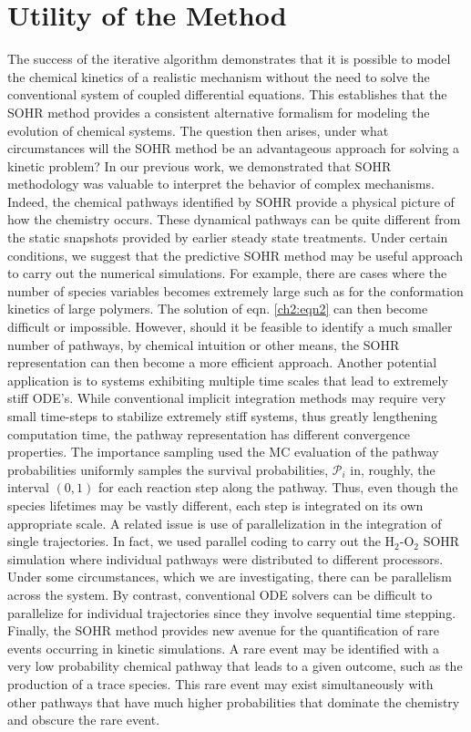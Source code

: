 \section{Utility of the Method}
\label{ch4:sec:utility}
The success of the iterative
algorithm demonstrates that it is possible to model the
chemical kinetics of a realistic mechanism without the need
to solve the conventional system of coupled differential
equations. This establishes that the SOHR method provides a
consistent alternative formalism for modeling the evolution of
chemical systems. The question then arises, under what
circumstances will the SOHR method be an advantageous
approach for solving a kinetic problem? In our previous work,
we demonstrated that SOHR methodology was valuable to
interpret the behavior of complex mechanisms. Indeed, the
chemical pathways identified by SOHR provide a physical
picture of how the chemistry occurs. These dynamical pathways
can be quite different from the static snapshots provided by
earlier steady state treatments. Under certain conditions, we
suggest that the predictive SOHR method may be useful
approach to carry out the numerical simulations. For example,
there are cases where the number of species variables becomes
extremely large such as for the conformation kinetics of large
polymers. The solution of eqn. \ref{ch2:eqn2} can then become difficult or 
impossible. However, should it be feasible to identify a much
smaller number of pathways, by chemical intuition or other
means, the SOHR representation can then become a more
efficient approach. Another potential application is to systems
exhibiting multiple time scales that lead to extremely stiff
ODE's. While conventional implicit integration methods may
require very small time-steps to stabilize extremely stiff systems,
thus greatly lengthening computation time, the pathway
representation has different convergence properties. The
importance sampling used the MC evaluation of the pathway
probabilities uniformly samples the survival probabilities, ${\mathcal{P}}_i$ in,
roughly, the interval $(0,1)$ for each reaction step along the
pathway. Thus, even though the species lifetimes may be vastly
different, each step is integrated on its own appropriate scale. A
related issue is use of parallelization in the integration of single
trajectories. In fact, we used parallel coding to carry out the H$_2$-O$_2$ SOHR simulation where individual pathways were
distributed to different processors. Under some circumstances,
which we are investigating, there can be parallelism across the
system. By contrast, conventional ODE solvers can be difficult
to parallelize for individual trajectories since they involve
sequential time stepping.\cite{ch4_35_skeel1992limits} Finally, the SOHR method provides
new avenue for the quantification of rare events occurring in
kinetic simulations. A rare event may be identified with a very
low probability chemical pathway that leads to a given outcome,
such as the production of a trace species. This rare event may
exist simultaneously with other pathways that have much higher
probabilities that dominate the chemistry and obscure the rare
event.